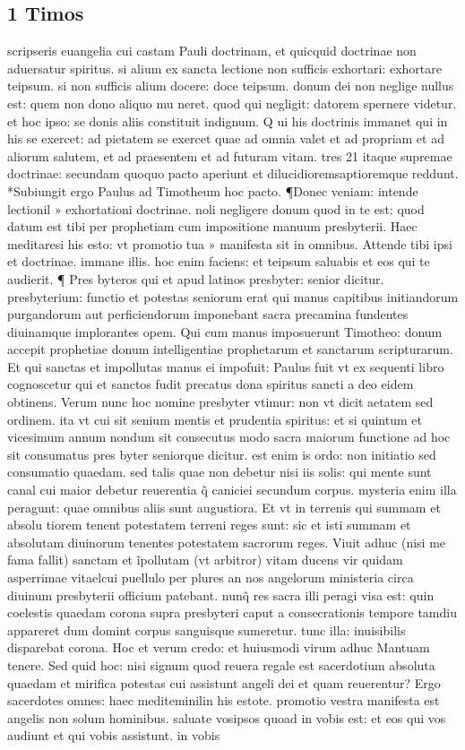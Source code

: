 \documentclass{article}
\begin{document}
\begin{pages}
\section*{1 Timos }
\marginpar{[ p.208 ]}\pstart scripseris euangelia cui castam Pauli doctrinam, et quicquid doctrinae non aduersatur spiritus. si alium ex sancta lectione non sufficis exhortari: exhortare teipsum. si non sufficis alium docere: doce teipsum. donum dei non neglige nullus est: quem non dono aliquo mu neret. quod qui negligit: datorem spernere videtur. et hoc ipso: se donis aliis constituit indignum. Q ui his doctrinis immanet qui in his se exercet: ad pietatem se exercet quae ad omnia valet et ad propriam et ad aliorum salutem, et ad praesentem et ad futuram vitam. tres 21 itaque supremae doctrinae: secundam quoquo pacto aperiunt et dilucidioremsaptioremque reddunt. *Subiungit ergo Paulus ad Timotheum hoc pacto. ¶Donec veniam: intende lectionil » exhortationi doctrinae. noli negligere donum quod in te est: quod datum est tibi per prophetiam cum impositione manuum presbyterii. Haec meditaresi his esto: vt promotio tua » manifesta sit in omnibus. Attende tibi ipsi et doctrinae. immane illis. hoc enim faciens: et  teipsum saluabis et eos qui te audierit. ¶ Pres byteros qui et apud latinos presbyter: senior dicitur. presbyterium: functio et potestas seniorum erat qui manus capitibus initiandorum purgandorum aut perficiendorum imponebant sacra precamina fundentes diuinamque  implorantes opem. Qui cum manus imposuerunt Timotheo: donum accepit prophetiae donum intelligentiae prophetarum et sanctarum scripturarum. Et qui sanctas et impollutas manus ei impofuit: Paulus fuit vt ex sequenti libro cognoscetur qui et sanctos fudit precatus dona spiritus sancti a deo eidem obtinens. Verum nunc hoc nomine presbyter vtimur: non vt dicit aetatem sed ordinem. ita vt cui sit senium mentis et prudentia spiritus: et si quintum et vicesimum annum nondum sit consecutus modo sacra maiorum functione ad hoc sit consumatus pres byter seniorque dicitur. est enim is ordo: non initiatio sed consumatio quaedam. sed talis quae non debetur nisi iis solis: qui mente sunt canal cui maior debetur reuerentia q̃ caniciei secundum corpus. mysteria enim illa peragunt: quae omnibus aliis sunt augustiora. Et vt in terrenis qui summam et absolu tiorem tenent potestatem terreni reges sunt: sic et isti summam et absolutam diuinorum tenentes potestatem sacrorum reges. Viuit adhuc (nisi me fama fallit) sanctam et ĩpollutam (vt arbitror) vitam ducens vir quidam asperrimae vitaelcui puellulo per plures an nos angelorum ministeria circa diuinum presbyterii officium patebant. nunq̃ res sacra illi peragi visa est: quin coelestis quaedam corona supra presbyteri caput a consecrationis tempore tamdiu appareret dum domint corpus sanguisque sumeretur. tunc illa: inuisibilis disparebat corona. Hoc et verum credo: et huiusmodi virum adhuc Mantuam tenere. Sed quid hoc: nisi signum quod reuera regale est sacerdotium absoluta quaedam et mirifica potestas cui assistunt angeli dei et quam reuerentur? Ergo sacerdotes omnes: haec mediteminilin his estote. promotio vestra manifesta est angelis non solum hominibus. saluate vosipsos quoad in vobis est: et eos qui vos audiunt et qui vobis assistunt. in vobis 
\end{pages}
\end{document}
